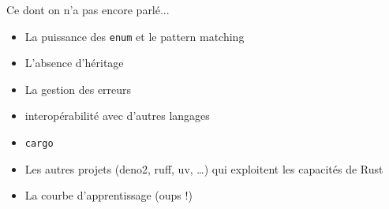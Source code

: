 \documentclass[usenames,dvipsnames]{beamer}
\begin{document}

	
	

	
	


\begin{frame}{Ce dont on n'a pas encore parlé...}
	\begin{itemize}
		\item La puissance des \texttt{enum} et le pattern matching
		\item L'absence d'héritage
		\item La gestion des erreurs
		\item interopérabilité avec d'autres langages
		\item \texttt{cargo}
		\item Les autres projets (deno2, ruff, uv, \dots) qui exploitent les capacités de Rust
		\item La courbe d'apprentissage (oups !)
	\end{itemize}
\end{frame}
\end{document}
